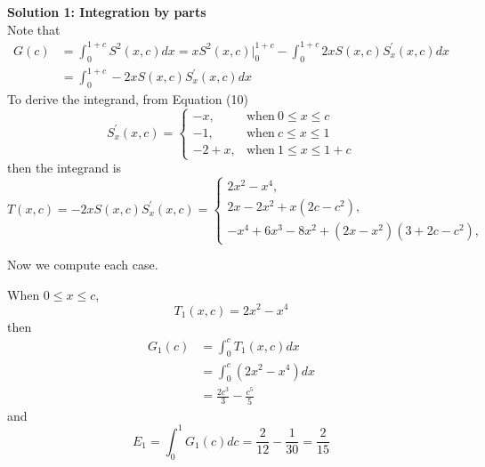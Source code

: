 \documentclass[12pt]{simple_doc}
\begin{document}
    \medskip
    \textbf{Solution 1: Integration by parts}\\
    Note that
    \begin{equation}
        \begin{aligned}
            G(c) &= \int_0^{1 + c} S^2(x, c) dx = xS^2(x, c)\biggr\rvert_0^{1+c}
                    - \int_0^{1 + c} 2xS(x,c)S_x^{'}(x,c) dx\\
                 &= \int_0^{1 + c} -2xS(x,c)S_x^{'}(x,c) dx
        \end{aligned}
    \end{equation}
    To derive the integrand, from Equation (10)
    \begin{equation}
        S_x^{'}(x, c) =
            \begin{cases}
              -x, & \text{when}\ 0 \leqslant x \leqslant c\\
              -1, & \text{when}\ c \leqslant x \leqslant 1\\
              -2 +x, & \text{when}\ 1 \leqslant x \leqslant 1 + c
            \end{cases}
    \end{equation}
    then the integrand is
    \begin{equation}
        T(x, c) = -2xS(x, c)S_x^{'}(x, c) =
            \begin{cases}
              2x^2 - x^4, &\\
              2x - 2x^2 + x(2c - c^2), &\\
              -x^4 +6x^3 -8x^2 + (2x - x^2)(3 + 2c - c^2), &
            \end{cases}
    \end{equation}

    Now we compute each case.

    When $0 \leqslant x \leqslant c$,
    \begin{equation}
        T_1(x, c) = 2x^2 - x^4
    \end{equation}
    then
    \begin{equation}
		\begin{aligned}
		G_1(c) &= \int_0^c T_1(x, c) dx \\
		   &= \int_0^c (2x^2 - x^4) dx\\
           &= \frac{2c^3}{3} - \frac{c^5}{5}
		\end{aligned}
	\end{equation}
    and
    \begin{equation}
        E_1 = \int_0^1 G_1(c)dc = \frac{2}{12} - \frac{1}{30} = \frac{2}{15}
    \end{equation}
\end{document}
